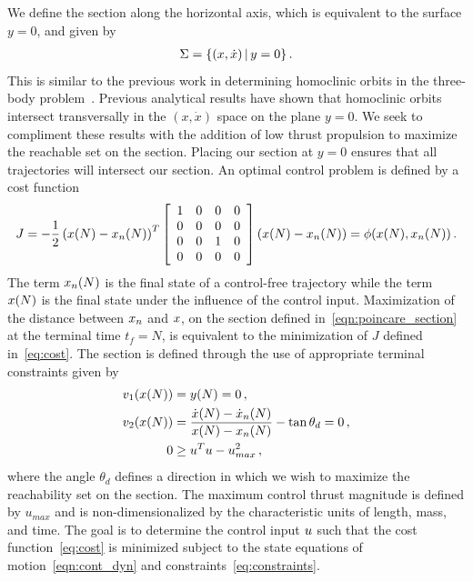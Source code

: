 We define the \Poincare section along the horizontal axis, which is equivalent to the surface \( y = 0 \), and given by
\begin{align}
        \Sigma = \left\{  ( x, \dot{x}) \, | \, y = 0 \right\} . 
        \label{eqn:poincare_section}
\end{align}
This is similar to the previous work in determining homoclinic orbits in the three-body problem~\cite{llibre1985,koon2011}.
Previous analytical results have shown that homoclinic orbits intersect transversally in the \( (x, \dot{x} ) \) space on the plane \( y = 0 \).
We seek to compliment these results with the addition of low thrust propulsion to maximize the reachable set on the \Poincare section.
Placing our section at \( y = 0\) ensures that all trajectories will intersect our section.
An optimal control problem is defined by a  cost function
\begin{equation}
        J = -\frac{1}{2} \left( x(N) - x_{n}(N)\right)^T 
        \left[
        \begin{array}{cccc}
                1 & 0& 0& 0 \\
                 0& 0& 0& 0\\
                 0 & 0 & 1 &0\\
                 0 & 0& 0& 0
        \end{array}
        \right]
        \left( x(N) - x_{n}(N)\right) = \phi(x(N),x_n(N)) \, .
        \label{eq:cost}
\end{equation}
The term \( x_n(N) \) is the final state of a control-free trajectory while the term \( x(N)\) is the final state under the influence of the control input.
Maximization of the distance between \( x_n \) and \(x \), on the \Poincare section defined in~\cref{eqn:poincare_section} at the terminal time \( t_f = N \), is equivalent to the minimization of \( J \) defined in~\cref{eq:cost}.
The \Poincare section is defined through the use of appropriate terminal constraints given by
\begin{subequations}
\begin{align}
    v_1( x(N) ) &= y(N) = 0 \, , \\ 
    v_2 ( x(N) )&=  \frac{\dot{x}(N) - \dot{x}_n(N) }{x(N) -x_n(N) } - \tan{\theta_d} = 0\, , \\
         0 &\geq u^T u - u_{max}^2 \, ,
\end{align}
    \label{eq:constraints}
\end{subequations}
where the angle \( \theta_d\) defines a direction in which we wish to maximize the reachability set on the \Poincare section.
The maximum control thrust magnitude is defined by \( u_{max} \) and is non-dimensionalized by the characteristic units of length, mass, and time.
The goal is to determine the control input \( u\) such that the cost function~\cref{eq:cost} is minimized subject to the state equations of motion~\cref{eqn:cont_dyn} and constraints~\cref{eq:constraints}.

